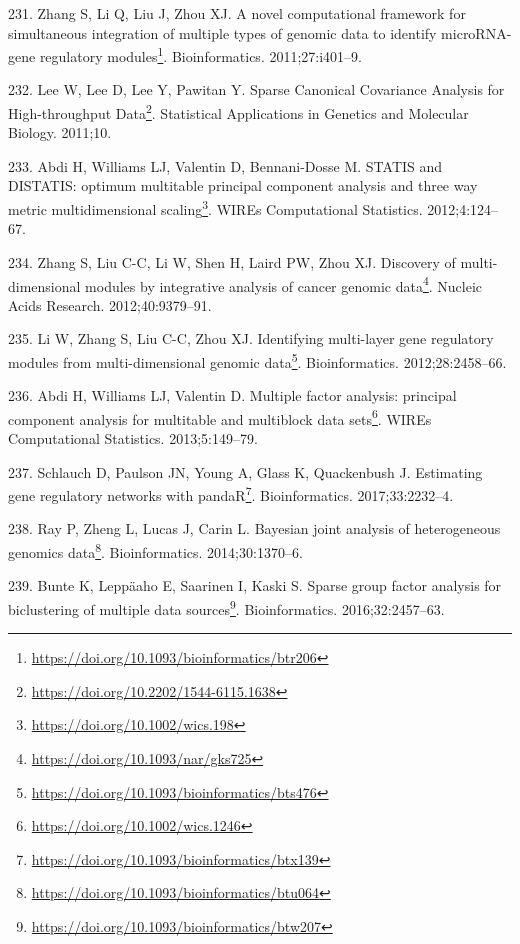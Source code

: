 \documentclass[
  a4paper,
]{book}
\DeclareRobustCommand{\href}[2]{#2\footnote{\url{#1}}}
\newlength{\cslhangindent}
\newlength{\cslentryspacingunit} %
\newenvironment{CSLReferences}[2] %
 {%
  \setlength{\parindent}{0pt}
  \ifodd #1
  \let\oldpar\par
  \def\par{\hangindent=\cslhangindent\oldpar}
  \fi
  \setlength{\parskip}{#2\cslentryspacingunit}
 }%
 {}
\begin{document}
\begin{CSLReferences}{0}{0}
\leavevmode{}%
231. Zhang S, Li Q, Liu J, Zhou XJ. \href{https://doi.org/10.1093/bioinformatics/btr206}{A novel computational framework for simultaneous integration of multiple types of genomic data to identify microRNA-gene regulatory modules}. Bioinformatics. 2011;27:i401--9.

\leavevmode{}%
232. Lee W, Lee D, Lee Y, Pawitan Y. \href{https://doi.org/10.2202/1544-6115.1638}{Sparse Canonical Covariance Analysis for High-throughput Data}. Statistical Applications in Genetics and Molecular Biology. 2011;10.

\leavevmode{}%
233. Abdi H, Williams LJ, Valentin D, Bennani-Dosse M. \href{https://doi.org/10.1002/wics.198}{STATIS and DISTATIS: optimum multitable principal component analysis and three way metric multidimensional scaling}. WIREs Computational Statistics. 2012;4:124--67.

\leavevmode{}%
234. Zhang S, Liu C-C, Li W, Shen H, Laird PW, Zhou XJ. \href{https://doi.org/10.1093/nar/gks725}{Discovery of multi-dimensional modules by integrative analysis of cancer genomic data}. Nucleic Acids Research. 2012;40:9379--91.

\leavevmode{}%
235. Li W, Zhang S, Liu C-C, Zhou XJ. \href{https://doi.org/10.1093/bioinformatics/bts476}{Identifying multi-layer gene regulatory modules from multi-dimensional genomic data}. Bioinformatics. 2012;28:2458--66.

\leavevmode{}%
236. Abdi H, Williams LJ, Valentin D. \href{https://doi.org/10.1002/wics.1246}{Multiple factor analysis: principal component analysis for multitable and multiblock data sets}. WIREs Computational Statistics. 2013;5:149--79.

\leavevmode{}%
237. Schlauch D, Paulson JN, Young A, Glass K, Quackenbush J. \href{https://doi.org/10.1093/bioinformatics/btx139}{Estimating gene regulatory networks with pandaR}. Bioinformatics. 2017;33:2232--4.

\leavevmode{}%
238. Ray P, Zheng L, Lucas J, Carin L. \href{https://doi.org/10.1093/bioinformatics/btu064}{Bayesian joint analysis of heterogeneous genomics data}. Bioinformatics. 2014;30:1370--6.

\leavevmode{}%
239. Bunte K, Leppäaho E, Saarinen I, Kaski S. \href{https://doi.org/10.1093/bioinformatics/btw207}{Sparse group factor analysis for biclustering of multiple data sources}. Bioinformatics. 2016;32:2457--63.


\end{CSLReferences}
\end{document}
